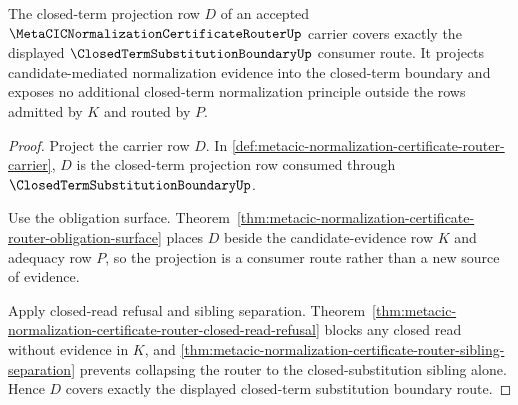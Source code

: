 \begin{theorem}
\label{thm:metacic-normalization-certificate-router-projection-coverage}
The closed-term projection row $D$ of an accepted $\MetaCICNormalizationCertificateRouterUp$ carrier covers exactly the displayed $\ClosedTermSubstitutionBoundaryUp$ consumer route. It projects candidate-mediated normalization evidence into the closed-term boundary and exposes no additional closed-term normalization principle outside the rows admitted by $K$ and routed by $P$.
\end{theorem}
\begin{proof}
Project the carrier row $D$. In \autoref{def:metacic-normalization-certificate-router-carrier}, $D$ is the closed-term projection row consumed through $\ClosedTermSubstitutionBoundaryUp$.

Use the obligation surface. Theorem~\ref{thm:metacic-normalization-certificate-router-obligation-surface} places $D$ beside the candidate-evidence row $K$ and adequacy row $P$, so the projection is a consumer route rather than a new source of evidence.

Apply closed-read refusal and sibling separation. Theorem~\ref{thm:metacic-normalization-certificate-router-closed-read-refusal} blocks any closed read without evidence in $K$, and \autoref{thm:metacic-normalization-certificate-router-sibling-separation} prevents collapsing the router to the closed-substitution sibling alone. Hence $D$ covers exactly the displayed closed-term substitution boundary route.
\end{proof}

